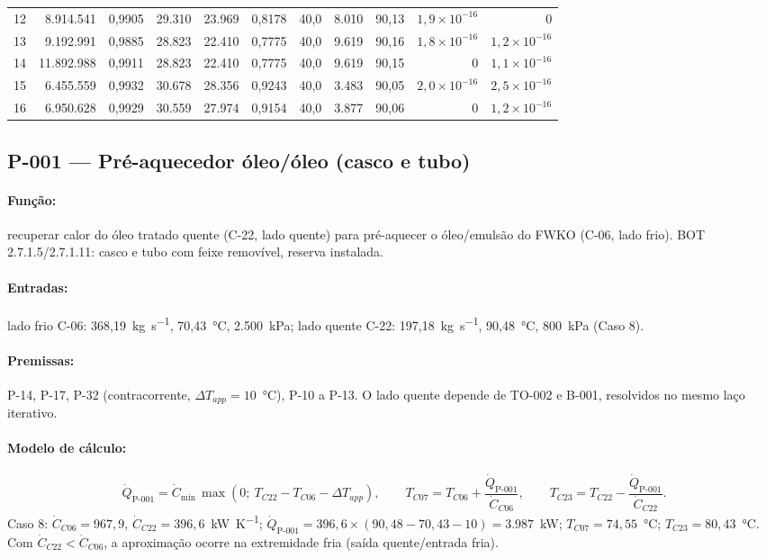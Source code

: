 \documentclass[11pt,a4paper]{article}
\numberwithin{equation}{section}
\numberwithin{table}{section}
\numberwithin{figure}{section}
\begin{document}
{\begin{longtable}{rrrrrrrrrrr}
12 & 8.914.541 & 0,9905 & 29.310 & 23.969 & 0,8178 & 40,0 & 8.010 & 90,13 & $1{,}9\times10^{-16}$ & $0$\\
13 & 9.192.991 & 0,9885 & 28.823 & 22.410 & 0,7775 & 40,0 & 9.619 & 90,16 & $1{,}8\times10^{-16}$ & $1{,}2\times10^{-16}$\\
14 & 11.892.988 & 0,9911 & 28.823 & 22.410 & 0,7775 & 40,0 & 9.619 & 90,15 & $0$ & $1{,}1\times10^{-16}$\\
15 & 6.455.559 & 0,9932 & 30.678 & 28.356 & 0,9243 & 40,0 & 3.483 & 90,05 & $2{,}0\times10^{-16}$ & $2{,}5\times10^{-16}$\\
16 & 6.950.628 & 0,9929 & 30.559 & 27.974 & 0,9154 & 40,0 & 3.877 & 90,06 & $0$ & $1{,}2\times10^{-16}$\\
\bottomrule\end{longtable}}
\subsection{P-001 --- Pré-aquecedor óleo/óleo (casco e tubo)}
\paragraph{Função:} recuperar calor do óleo tratado quente (C-22, lado quente) para pré-aquecer o óleo/emulsão do FWKO (C-06, lado frio). BOT 2.7.1.5/2.7.1.11: casco e tubo com feixe removível, reserva instalada.
\paragraph{Entradas:} lado frio C-06: 368,19~\si{\kilogram\per\second}, 70,43~\si{\celsius}, 2.500~\si{\kilo\pascal}; lado quente C-22: 197,18~\si{\kilogram\per\second}, 90,48~\si{\celsius}, 800~\si{\kilo\pascal} (Caso 8).
\paragraph{Premissas:} P-14, P-17, P-32 (contracorrente, $\Delta T_{app}=10$~\si{\celsius}), P-10 a P-13. O lado quente depende de TO-002 e B-001, resolvidos no mesmo laço iterativo.
\paragraph{Modelo de cálculo:}
\begin{equation}\label{eq:preheat}
\dot Q_{\mbox{P-001}}=\dot C_{\min}\,\max\!\left(0;\ T_{C22}-T_{C06}-\Delta T_{app}\right),\qquad T_{C07}=T_{C06}+\frac{\dot Q_{\mbox{P-001}}}{\dot C_{C06}},\qquad T_{C23}=T_{C22}-\frac{\dot Q_{\mbox{P-001}}}{\dot C_{C22}}.
\end{equation}
Caso 8: $\dot C_{C06}=967{,}9$, $\dot C_{C22}=396{,}6$~\si{\kilo\watt\per\kelvin}; $\dot Q_{\mbox{P-001}}=396{,}6\times(90{,}48-70{,}43-10)=3.987$~\si{\kilo\watt}; $T_{C07}=74{,}55$~\si{\celsius}; $T_{C23}=80{,}43$~\si{\celsius}. Com $\dot C_{C22}<\dot C_{C06}$, a aproximação ocorre na extremidade fria (saída quente/entrada fria).
\end{document}
